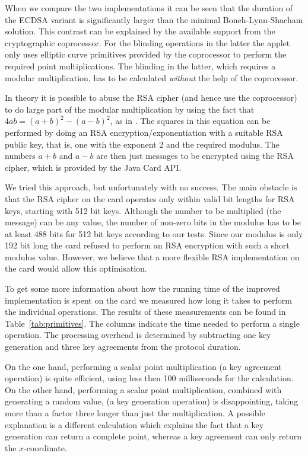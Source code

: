 When we compare the two implementations it can be seen that the duration of the
ECDSA variant is significantly larger than the minimal Boneh-Lynn-Shacham
solution. This contrast can be explained by the available support from the
cryptographic coprocessor. For the blinding operations in the latter the applet
only uses elliptic curve primitives provided by the coprocessor to perform the
required point multiplications. The blinding in the latter, which requires a
modular multiplication, has to be calculated \emph{without} the help of the
coprocessor.

In theory it is possible to abuse the RSA cipher (and hence use the coprocessor)
to do large part of the modular multiplication by using the fact that
$4ab = (a+b)^2 - (a-b)^2$, as in \cite{Sterckx09,TewsJacobs09}. The squares in
this equation can be performed by doing an RSA encryption\slash exponentiation
with a suitable RSA public key, that is, one with the exponent 2 and the
required modulus. The numbers $a+b$ and $a-b$ are then just messages to be
encrypted using the RSA cipher, which is provided by the Java Card API.

We tried this approach, but unfortunately with no success. The main obstacle is
that the RSA cipher on the card operates only within valid bit lengths for RSA
keys, starting with 512 bit keys. Although the number to be multiplied (the
message) can be any value, the number of non-zero bits in the modulus has to be
at least 488 bits for 512 bit keys according to our tests. Since our modulus is
only 192 bit long the card refused to perform an RSA encryption with such a
short modulus value. However, we believe that a more flexible RSA implementation
on the card would allow this optimisation.

To get some more information about how the running time of the improved
implementation is spent on the card we measured how long it takes to perform the
individual operations. The results of these measurements can be found in
Table~\ref{tab:primitives}. The columns indicate the time needed to perform a
single operation. The processing overhead is determined by subtracting one key
generation and three key agreements from the protocol duration.

On the one hand, performing a scalar point multiplication (a key agreement
operation) is quite efficient, using less then 100 milliseconds for the
calculation. On the other hand, performing a scalar point multiplication,
combined with generating a random value, (a key generation operation) is
disappointing, taking more than a factor three longer than just the
multiplication. A possible explanation is a different calculation which explains
the fact that a key generation can return a complete point, whereas a key
agreement can only return the $x$-coordinate.

